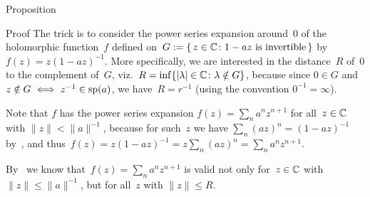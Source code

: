 \documentclass[main]{subfiles}
\begin{document}
\begin{parsec}
\begin{point}{Proposition}
\begin{point}{Proof}
The trick is to consider
the power series expansion
around~$0$ of the holomorphic function~$f$ defined
on~$G:=\{\,z\in \mathbb{C}\colon 1-az\text{ is invertible}\,\}$ 
by  $f(z)=z(1-az)^{-1}$.
More specifically,
we are interested in the distance~$R$
of~$0$ to the complement of~$G$,
viz.~$R= \inf\{\left|\lambda\right|\in \mathbb{C}\colon \lambda\notin G\}$,
because since $0\in G$
and $z\notin G\iff z^{-1}\in \mathrm{sp}(a)$,
we have~$R=r^{-1}$
(using the convention $0^{-1}=\infty$).

Note that $f$ has the power series expansion
$f(z) = \sum_n a^nz^{n+1}$
for all~$z\in \mathbb{C}$ with $\|z\|<\|a\|^{-1}$,
because for such~$z$
we have $\sum_n (az)^n=(1-az)^{-1}$
by~,
and thus~$f(z)=z(1-az)^{-1}=z\sum_n (az)^n = \sum_n a^nz^{n+1}$.

By~
we know that~$f(z)=\sum_n a^nz^{n+1}$
is valid not only for~$z\in \mathbb{C}$ with $\|z\|\leq \|a\|^{-1}$,
but for all~$z$ with $\|z\|\leq R$.


\end{point}
\end{point}
\end{parsec}
\end{document}
